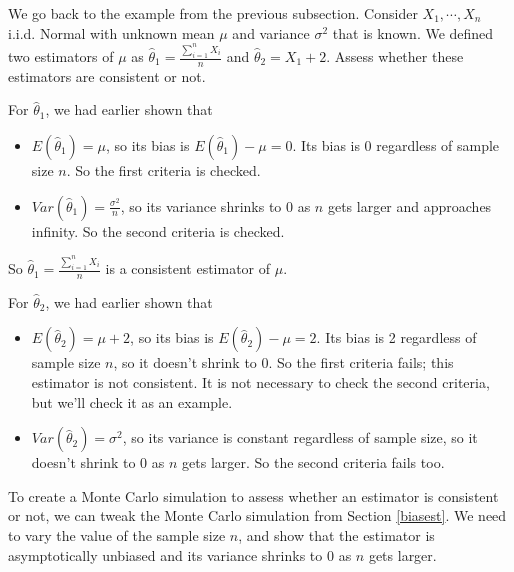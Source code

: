 \documentclass[
]{book}
\theoremstyle{definition}
\theoremstyle{definition}
\theoremstyle{definition}
\theoremstyle{definition}
\theoremstyle{remark}
\begin{document}
We go back to the example from the previous subsection. Consider \(X_1, \cdots, X_n\) i.i.d. Normal with unknown mean \(\mu\) and variance \(\sigma^2\) that is known. We defined two estimators of \(\mu\) as \(\hat{\theta}_1 = \frac{\sum_{i=1}^n X_i}{n}\) and \(\hat{\theta}_2 = X_1 + 2\). Assess whether these estimators are consistent or not.

For \(\hat{\theta}_1\), we had earlier shown that

\begin{itemize}
\item
  \(E(\hat{\theta}_1) = \mu\), so its bias is \(E(\hat{\theta}_1) - \mu = 0\). Its bias is 0 regardless of sample size \(n\). So the first criteria is checked.
\item
  \(Var(\hat{\theta}_1) = \frac{\sigma^2}{n}\), so its variance shrinks to 0 as \(n\) gets larger and approaches infinity. So the second criteria is checked.
\end{itemize}

So \(\hat{\theta}_1 = \frac{\sum_{i=1}^n X_i}{n}\) is a consistent estimator of \(\mu\).

For \(\hat{\theta}_2\), we had earlier shown that

\begin{itemize}
\item
  \(E(\hat{\theta}_2) = \mu + 2\), so its bias is \(E(\hat{\theta}_2) - \mu = 2\). Its bias is 2 regardless of sample size \(n\), so it doesn't shrink to 0. So the first criteria fails; this estimator is not consistent. It is not necessary to check the second criteria, but we'll check it as an example.
\item
  \(Var(\hat{\theta}_2) = \sigma^2\), so its variance is constant regardless of sample size, so it doesn't shrink to 0 as \(n\) gets larger. So the second criteria fails too.
\end{itemize}

To create a Monte Carlo simulation to assess whether an estimator is consistent or not, we can tweak the Monte Carlo simulation from Section \ref{biasest}. We need to vary the value of the sample size \(n\), and show that the estimator is asymptotically unbiased and its variance shrinks to 0 as \(n\) gets larger.
\end{document}
